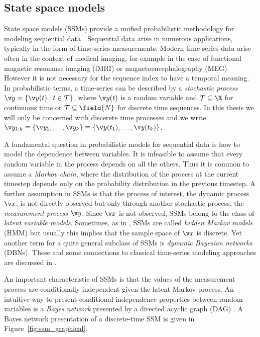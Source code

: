 \subsection{State space models}

State space models (SSMs) provide a unified probabilistic methodology for modeling
sequential data \parencite{ljung1994modeling,durbin2012time,Cappe2005,barber2011bayesian}. 
Sequential data arise in numerous applications, 
typically in the form of time-series measurements. Modern time-series data arise 
often in the context of medical imaging,
for example in the case of functional magnetic resonanse imaging (fMRI) or magnetoencephalography (MEG).
However it is not necessary for the sequence index to have
a temporal meaning. In probabilistic terms, a time-series
can be described by a \emph{stochastic process} $\y = \left\{\y(t): t\in \mathcal{T}\right\}$, 
where $\y(t)$ is a random variable and $\mathcal{T}\subseteq\R$ for continuous time or 
$\mathcal{T}\subseteq\field{N}$ for discrete time sequences.
In this thesis we will only be concerned with discerete time processes 
and we write $\y_{1:k}\equiv\{\y_1,\dots,\y_k\}\equiv\{\y(t_1),\dots,\y(t_k)\}$.

A fundamental question in probabilistic models for sequential data is how 
to model the dependence between variables. It is infeasible to assume
that every random variable in the process depends on all the others.
Thus it is common to assume a \emph{Markov chain}, where the distribution of
the process at the current timestep depends only on the probability distribution in the previous timestep.
A further assumption in SSMs is that the process of interest, the dynamic process $\x$, is not directly observed
but only through another stochastic process, the \emph{measurement process} $\y$. Since
$\x$ is not observed, SSMs belong to the class of \emph{latent variable models}. Sometimes, as in
\textcite{Cappe2005}, SSMs are called \emph{hidden Markov models} (HMM) but usually this implies that
the sample space of $\x$ is discrete. Yet another term for a quite general subclass
of SSMs is \emph{dynamic Bayesian networks} (DBNs). These and some connections
to classical time-series modeling approaches are discussed in \textcite{Murphy2002}. 

An important characteristic of SSMs is that the values of the measurement process are conditionally independent
given the latent Markov process. An intuitive way to present conditional 
independence properties between random variables is a \emph{Bayes network} 
presented by a directed acyclic graph (DAG) \parencite{pearl1988probabilistic,Bishop2006}.
A Bayes network presentation of a discrete-time SSM is given in Figure~\ref{fig:ssm_graphical}.

